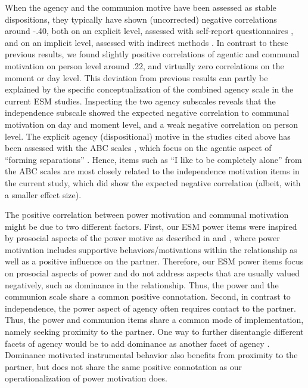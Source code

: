 \documentclass[jou,a4paper,draftfirst]{apa6}\usepackage[]{graphicx}\usepackage[]{color}
\begin{document}
When the agency and the communion motive have been assessed as stable dispositions, they typically have shown (uncorrected) negative correlations around -.40, both on an explicit level, assessed with self-report questionnaires \parencite{hagemeyer_abc_2013}, and on an implicit level, assessed with indirect methods \parencite{hagemeyer_AssessingImplicitMotivational_2012}. 
In contrast to these previous results, we found slightly positive correlations of agentic and communal motivation on person level around .22, and virtually zero correlations on the moment or day level. This deviation from previous results can partly be explained by the specific conceptualization of the combined agency scale in the current ESM studies. Inspecting the two agency subscales reveals that the independence subscale showed the expected negative correlation to communal motivation on day and moment level, and a weak negative correlation on person level. The explicit agency (dispositional) motive in the studies cited above has been assessed with the ABC scales \parencite{hagemeyer_abc_2013}, which focus on the agentic aspect of ``forming separations'' \parencite{bakan_duality_1966}. Hence, items such as ``I like to be completely alone'' from the ABC scales are most closely related to the independence motivation items in the current study, which did show the expected negative correlation (albeit, with a smaller effect size).

The positive correlation between power motivation and communal motivation might be due to two different factors. First, our ESM power items were inspired by prosocial aspects of the power motive as described in \textcite{winter_ManualScoringMotive_1994} and \textcite{hagemeyer_AssessingImplicitMotivational_2012}, where power motivation includes supportive behaviors/motivations within the relationship as well as a positive influence on the partner. Therefore, our ESM power items focus on prosocial aspects of power and do not address aspects that are usually valued negatively, such as dominance in the relationship. Thus, the power and the communion scale share a common positive connotation. Second, in contrast to independence, the power aspect of agency often requires contact to the partner. Thus, the power and communion items share a common mode of implementation, namely seeking proximity to the partner. One way to further disentangle different facets of agency would be to add dominance as another facet of agency \parencite{suessenbach_DominancePrestigeLeadership_2018a}. Dominance motivated instrumental behavior also benefits from proximity to the partner, but does not share the same positive connotation as our operationalization of power motivation does.
\end{document}
